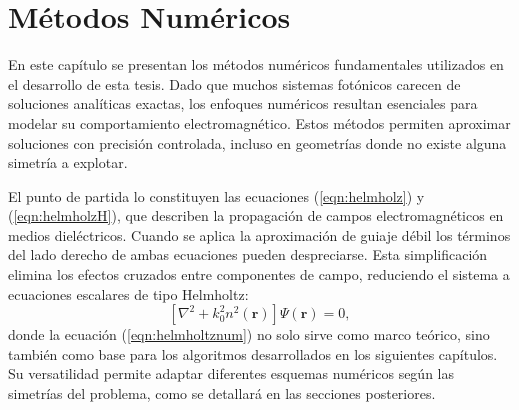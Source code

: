 \chapter{Métodos Numéricos \label{cap:num}}
En este capítulo se presentan los métodos numéricos fundamentales utilizados en el desarrollo de esta tesis. Dado que muchos sistemas fotónicos carecen de soluciones analíticas exactas, los enfoques numéricos resultan esenciales para modelar su comportamiento electromagnético. Estos métodos permiten aproximar soluciones con precisión controlada, incluso en geometrías donde no existe alguna simetría a explotar.

El punto de partida lo constituyen las ecuaciones (\ref{eqn:helmholz}) y (\ref{eqn:helmholzH}), que describen la propagación de campos electromagnéticos en medios dieléctricos. Cuando se aplica la aproximación de guiaje débil los términos del lado derecho de ambas ecuaciones pueden despreciarse. Esta simplificación elimina los efectos cruzados entre componentes de campo, reduciendo el sistema a ecuaciones escalares de tipo Helmholtz:
\begin{equation}
\left[\nabla^2 + k_0^2 n^2(\textbf{r})\right]\Psi(\textbf{r}) = 0, \label{eqn:helmholtznum}
\end{equation}
donde la ecuación (\ref{eqn:helmholtznum}) no solo sirve como marco teórico, sino también como base para los algoritmos desarrollados en los siguientes capítulos. Su versatilidad permite adaptar diferentes esquemas numéricos según las simetrías del problema, como se detallará en las secciones posteriores.
